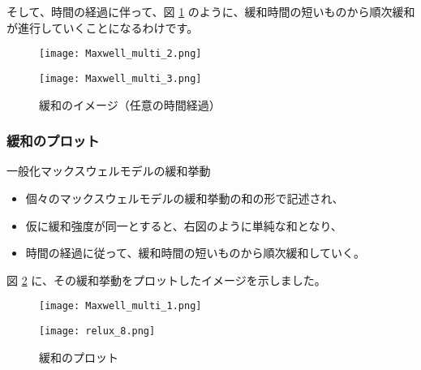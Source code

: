 \documentclass[uplatex,dvipdfmx,a4paper,11pt]{jsreport}
\begin{document}
そして、時間の経過に伴って、図 \ref{fig:img_gen_max_1} のように、緩和時間の短いものから順次緩和が進行していくことになるわけです。

\begin{figure}[htb]
	\begin{center}
		\begin{minipage}{0.45\textwidth}
			\begin{center}
				\texttt{[image: Maxwell\_multi\_2.png]}
			\end{center}
		\end{minipage}
		\begin{minipage}{0.45\textwidth}
			\begin{center}
				\texttt{[image: Maxwell\_multi\_3.png]}
			\end{center}
		\end{minipage}
		\caption{緩和のイメージ（任意の時間経過）}
		\label{fig:img_gen_max_1}
	\end{center}
\end{figure}

\subsubsection{緩和のプロット}
	\begin{center}
		\begin{minipage}{0.9\textwidth}
			\begin{itembox}[l]{一般化マックスウェルモデルの緩和挙動}
				\begin{itemize}
					\item 個々のマックスウェルモデルの緩和挙動の和の形で記述され、
					\item 仮に緩和強度が同一とすると、右図のように単純な和となり、
					\item 時間の経過に従って、緩和時間の短いものから順次緩和していく。
				\end{itemize}
			\end{itembox}
		\end{minipage}
	\end{center}

図 \ref{fig:plot_gen_max} に、その緩和挙動をプロットしたイメージを示しました。
\begin{figure}[htb]
	\begin{center}
		\begin{minipage}{0.45\textwidth}
			\begin{center}
				\texttt{[image: Maxwell\_multi\_1.png]}
			\end{center}
		\end{minipage}
		\begin{minipage}{0.45\textwidth}
			\begin{center}
				\texttt{[image: relux\_8.png]}
			\end{center}
		\end{minipage}
		\caption{緩和のプロット}
		\label{fig:plot_gen_max}
	\end{center}
\end{figure}
\end{document}
